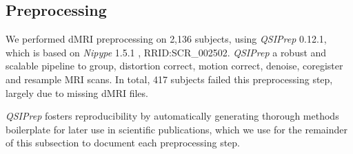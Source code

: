 \documentclass[fleqn,10pt]{wlscirep}
\begin{document}

\subsection*{Preprocessing}

We performed dMRI preprocessing on 2,136 subjects, using \emph{QSIPrep}
\cite{cieslak2021-iq} 0.12.1, which is based on \emph{Nipype} 1.5.1
\cite{nipype1,nipype2}, RRID:SCR\_002502. \emph{QSIPrep} a robust and scalable
pipeline to group, distortion correct, motion correct, denoise, coregister and
resample MRI scans.  In total, 417 subjects failed this preprocessing step,
largely due to missing dMRI files.

\emph{QSIPrep} fosters reproducibility by automatically generating thorough
methods boilerplate for later use in scientific publications, which we use for
the remainder of this subsection to document each preprocessing step.
\end{document}

